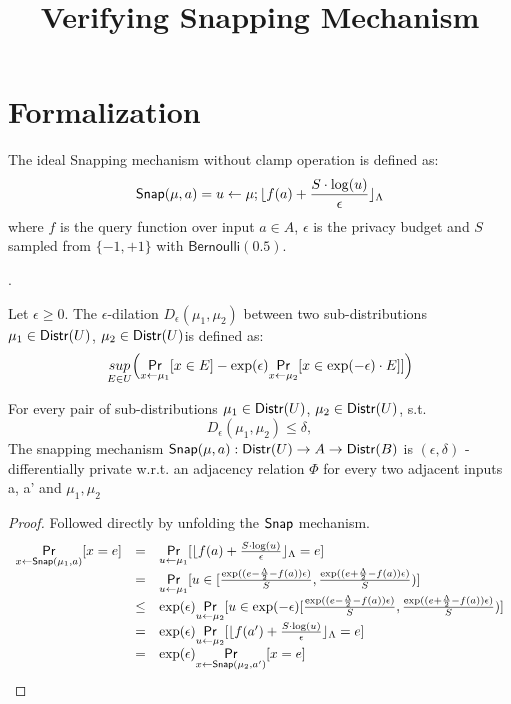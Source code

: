 \documentclass{article}
\begin{document}
\title{Verifying Snapping Mechanism}

\maketitle

\section{Formalization}
\begin{defn}
The ideal Snapping mechanism without clamp operation is defined as:
\[
	\mathsf{Snap}(\mu, a) = u \leftarrow \mu; \lfloor f(a) + \frac{ S \cdot \log(u)}{\epsilon} \rfloor_{\Lambda} 
\]
where $f$ is the query function over input $a \in A$, $\epsilon$ is the privacy budget and $S $ sampled from $ \{-1, +1\}$ with $\mathsf{Bernoulli}(0.5)$.
\end{defn}

\begin{defn}
.

Let $\epsilon \geq 0$. The $\epsilon$-dilation $D_{\epsilon}(\mu_1, \mu_2)$ between two sub-distributions $\mu_1 \in \mathsf{Distr}(U)$, $\mu_2 \in \mathsf{Distr}(U)$is defined as:
\[	
	\underset{E \in U}{sup}\Big(\underset{x \leftarrow \mu_1}{\mathsf{Pr}}[x \in E] - \exp(\epsilon) \underset{x \leftarrow \mu_2}{\mathsf{Pr}}[x \in \exp(-\epsilon) \cdot E]]\Big)
\]
\end{defn}

\begin{prop}
For every pair of sub-distributions $\mu_1 \in \mathsf{Distr}(U)$, $\mu_2 \in \mathsf{Distr}(U)$, s.t. 
\[
D_{\epsilon}(\mu_1, \mu_2) \leq \delta,
\]
The snapping mechanism $\mathsf{Snap}(\mu, a) : \mathsf{Distr}(U) \to A \to \mathsf{Distr}(B)$ is $(\epsilon, \delta)$ - differentially private w.r.t. an adjacency relation $\Phi$ for every two adjacent inputs a, a’ and $\mu_1, \mu_2$
\end{prop}

\begin{proof}
Followed directly by unfolding the $\mathsf{Snap}$ mechanism.
\[
	\begin{array}{lll}
	\underset{x \leftarrow \mathsf{Snap}(\mu_1, a)}{\mathsf{Pr}}[x = e] 
	& = & \underset{u \leftarrow \mu_1}{\mathsf{Pr}}[	\lfloor 
				f(a) + \frac{ S \cdot \log(u)}{\epsilon} 
				\rfloor_{\Lambda} = e
			]\\
	& = & \underset{ u \leftarrow \mu_1}{\mathsf{Pr}}[ u \in [
		   		\frac{\exp((e - \frac{\Lambda}{2} - f(a)) \epsilon )}{S},
		   		\frac{\exp((e + \frac{\Lambda}{2} - f(a)) \epsilon )}{S})
		   	]\\
	& \leq & \exp(\epsilon)
			\underset{ u \leftarrow \mu_2}{\mathsf{Pr}}[ u \in \exp(-\epsilon)[
		   		\frac{\exp((e - \frac{\Lambda}{2} - f(a)) \epsilon )}{S},
		   		\frac{\exp((e + \frac{\Lambda}{2} - f(a)) \epsilon )}{S})
		   	]\\
	& = & \exp(\epsilon)
			\underset{u \leftarrow \mu_2}{\mathsf{Pr}}[	\lfloor 
				f(a') + \frac{ S \cdot \log(u)}{\epsilon} 
				\rfloor_{\Lambda} = e
			]\\
	& = & \exp(\epsilon)
			\underset{x \leftarrow \mathsf{Snap}(\mu_2, a')}{\mathsf{Pr}}[x = e] 
	\end{array}
\]
\end{proof}
\end{document}
